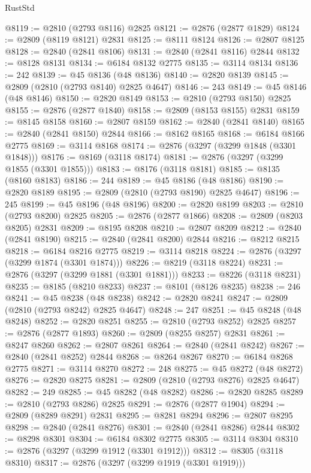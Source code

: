 \begin{lexlean}{RustStd}
\begin{coremodule}
@8119 := @2810 (@2793 @8116) @2825
@8121 := @2876 (@2877 @1829)
@8124 := @2809 (@8119 @8121) @2831
@8125 := @8111 @8124
@8126 := @2807 @8125
@8128 := @2840 (@2841 @8106)
@8131 := @2840 (@2841 @8116) @2844
@8132 := @8128 @8131
@8134 := @6184 @8132 @2775
@8135 := @3114 @8134
@8136 := 242
@8139 := @45 @8136 (@48 @8136)
@8140 := @2820 @8139
@8145 := @2809 (@2810 (@2793 @8140) @2825 @4647)
@8146 := 243
@8149 := @45 @8146 (@48 @8146)
@8150 := @2820 @8149
@8153 := @2810 (@2793 @8150) @2825
@8155 := @2876 (@2877 @1840)
@8158 := @2809 (@8153 @8155) @2831
@8159 := @8145 @8158
@8160 := @2807 @8159
@8162 := @2840 (@2841 @8140)
@8165 := @2840 (@2841 @8150) @2844
@8166 := @8162 @8165
@8168 := @6184 @8166 @2775
@8169 := @3114 @8168
@8174 := @2876 (@3297 (@3299 @1848 (@3301 @1848)))
@8176 := @8169 (@3118 @8174)
@8181 := @2876 (@3297 (@3299 @1855 (@3301 @1855)))
@8183 := @8176 (@3118 @8181)
@8185 := @8135 (@8160 @8183)
@8186 := 244
@8189 := @45 @8186 (@48 @8186)
@8190 := @2820 @8189
@8195 := @2809 (@2810 (@2793 @8190) @2825 @4647)
@8196 := 245
@8199 := @45 @8196 (@48 @8196)
@8200 := @2820 @8199
@8203 := @2810 (@2793 @8200) @2825
@8205 := @2876 (@2877 @1866)
@8208 := @2809 (@8203 @8205) @2831
@8209 := @8195 @8208
@8210 := @2807 @8209
@8212 := @2840 (@2841 @8190)
@8215 := @2840 (@2841 @8200) @2844
@8216 := @8212 @8215
@8218 := @6184 @8216 @2775
@8219 := @3114 @8218
@8224 := @2876 (@3297 (@3299 @1874 (@3301 @1874)))
@8226 := @8219 (@3118 @8224)
@8231 := @2876 (@3297 (@3299 @1881 (@3301 @1881)))
@8233 := @8226 (@3118 @8231)
@8235 := @8185 (@8210 @8233)
@8237 := @8101 (@8126 @8235)
@8238 := 246
@8241 := @45 @8238 (@48 @8238)
@8242 := @2820 @8241
@8247 := @2809 (@2810 (@2793 @8242) @2825 @4647)
@8248 := 247
@8251 := @45 @8248 (@48 @8248)
@8252 := @2820 @8251
@8255 := @2810 (@2793 @8252) @2825
@8257 := @2876 (@2877 @1893)
@8260 := @2809 (@8255 @8257) @2831
@8261 := @8247 @8260
@8262 := @2807 @8261
@8264 := @2840 (@2841 @8242)
@8267 := @2840 (@2841 @8252) @2844
@8268 := @8264 @8267
@8270 := @6184 @8268 @2775
@8271 := @3114 @8270
@8272 := 248
@8275 := @45 @8272 (@48 @8272)
@8276 := @2820 @8275
@8281 := @2809 (@2810 (@2793 @8276) @2825 @4647)
@8282 := 249
@8285 := @45 @8282 (@48 @8282)
@8286 := @2820 @8285
@8289 := @2810 (@2793 @8286) @2825
@8291 := @2876 (@2877 @1904)
@8294 := @2809 (@8289 @8291) @2831
@8295 := @8281 @8294
@8296 := @2807 @8295
@8298 := @2840 (@2841 @8276)
@8301 := @2840 (@2841 @8286) @2844
@8302 := @8298 @8301
@8304 := @6184 @8302 @2775
@8305 := @3114 @8304
@8310 := @2876 (@3297 (@3299 @1912 (@3301 @1912)))
@8312 := @8305 (@3118 @8310)
@8317 := @2876 (@3297 (@3299 @1919 (@3301 @1919)))

\end{coremodule}
\end{lexlean}
